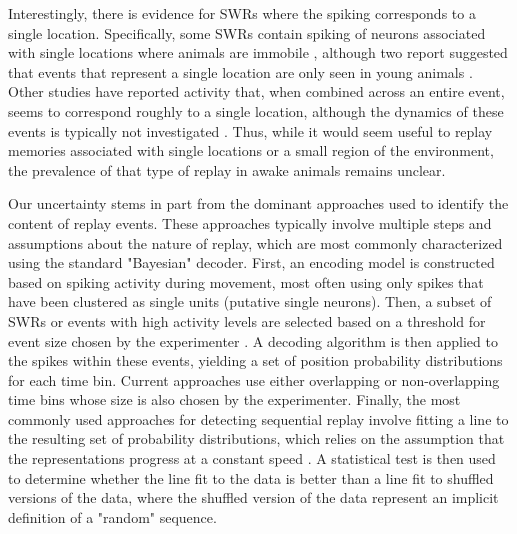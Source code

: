 \documentclass[9pt,lineno]{elife}
\begin{document}
Interestingly, there is evidence for SWRs where the spiking corresponds to a single location. Specifically, some SWRs contain spiking of neurons associated with single locations where animals are immobile \citep{YuDistincthippocampalcorticalmemory2017}, although two report suggested that events that represent a single location are only seen in young animals \citep{FarooqEmergencepreconfiguredplastic2019, MuessigCoordinatedEmergenceHippocampal2019}.  Other studies have reported activity that, when combined across an entire event, seems to correspond roughly to a single location, although the dynamics of these events is typically not investigated \citep{Dupretreorganizationreactivationhippocampal2010}. Thus, while it would seem useful to replay memories associated with single locations or a small region of the environment, the prevalence of that type of replay in awake animals remains unclear.

Our uncertainty stems in part from the dominant approaches used to identify the content of replay events. These approaches typically involve multiple steps and assumptions about the nature of replay, which are most commonly characterized using the standard "Bayesian" decoder. First, an encoding model is constructed based on spiking activity during movement, most often using only spikes that have been clustered as single units (putative single neurons). Then, a subset of SWRs or events with high activity levels are selected based on a threshold for event size chosen by the experimenter \citep{FosterReversereplaybehavioural2006, DibaForwardreversehippocampal2007a, KarlssonAwakereplayremote2009, StellaHippocampalReactivationRandom2019}. A decoding algorithm is then applied to the spikes within these events, yielding a set of position probability distributions for each time bin. Current approaches use either overlapping or non-overlapping time bins whose size is also chosen by the experimenter. Finally, the most commonly used approaches for detecting sequential replay involve fitting a line to the resulting set of probability distributions, which relies on the assumption that the representations progress at a constant speed \citep{FosterReversereplaybehavioural2006, DibaForwardreversehippocampal2007a, DavidsonHippocampalReplayExtended2009, KarlssonAwakereplayremote2009, CarrTransientSlowGamma2012, OlafsdottirTaskDemandsPredict2017, TangHippocampalPrefrontalReactivationLearning2017, DrieuNestedsequenceshippocampal2018,  ShinDynamicsAwakeHippocampalPrefrontal2019, TingleyRoutingHippocampalRipples2020, BhattaraiDistincteffectsreward2020}. A statistical test is then used to determine whether the line fit to the data is better than a line fit to shuffled versions of the data, where the shuffled version of the data represent an implicit definition of a "random" sequence.
\end{document}
